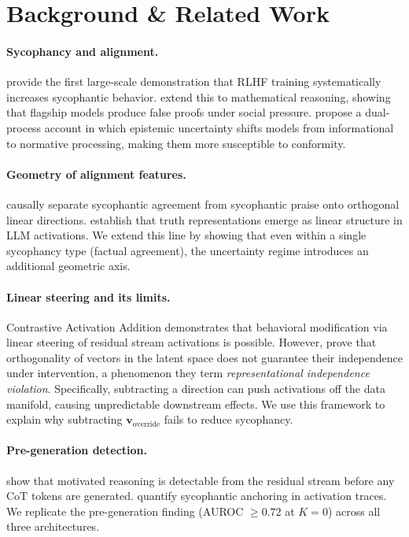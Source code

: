 \documentclass[11pt]{article}
\begin{document}
\section{Background \& Related Work}
\label{sec:related}

\paragraph{Sycophancy and alignment.}
\citet{sharma2024towards} provide the first large-scale demonstration that RLHF training systematically increases sycophantic behavior.
\citet{petrov2025brokenmath} extend this to mathematical reasoning, showing that flagship models produce false proofs under social pressure.
\citet{zhong2025investigating} propose a dual-process account in which epistemic uncertainty shifts models from informational to normative processing, making them more susceptible to conformity.

\paragraph{Geometry of alignment features.}
\citet{jiang2025sycophancy} causally separate sycophantic agreement from sycophantic praise onto orthogonal linear directions.
\citet{marks2024geometry} establish that truth representations emerge as linear structure in LLM activations.
We extend this line by showing that even within a single sycophancy type (factual agreement), the uncertainty regime introduces an additional geometric axis.

\paragraph{Linear steering and its limits.}
Contrastive Activation Addition \citep{rimsky2024steering} demonstrates that behavioral modification via linear steering of residual stream activations is possible.
However, \citet{wollschlager2025geometry} prove that orthogonality of vectors in the latent space does not guarantee their independence under intervention, a phenomenon they term \emph{representational independence violation}.
Specifically, subtracting a direction can push activations off the data manifold, causing unpredictable downstream effects.
We use this framework to explain why subtracting $\mathbf{v}_{\text{override}}$ fails to reduce sycophancy.

\paragraph{Pre-generation detection.}
\citet{mirtaheri2026motivated} show that motivated reasoning is detectable from the residual stream before any CoT tokens are generated.
\citet{duszenko2026sycophantic} quantify sycophantic anchoring in activation traces.
We replicate the pre-generation finding (AUROC $\geq 0.72$ at $K{=}0$) across all three architectures.
\end{document}
